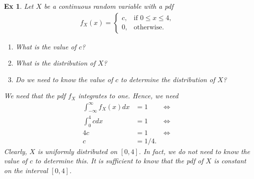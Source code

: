 \documentclass[a4paper,11pt]{article}
\newtheorem{exercise}[theorem]{Ex}
\begin{document}
\begin{exercise}
Let $X$ be a continuous random variable with a pdf
\begin{align}
    f_X(x) = \begin{cases}
    c, &\text{if } 0 \leq x \leq 4, \\
    0, &\text{otherwise}.
    \end{cases}
\end{align}
\begin{enumerate}
    \item What is the value of $c$?
    \item What is the distribution of $X$?
    \item Do we need to know the value of $c$ to determine the distribution of $X$?
\end{enumerate}

\begin{solution}
We need that the pdf $f_X$ integrates to one. Hence, we need
\begin{align}
    \int_{-\infty}^\infty f_X(x) dx &= 1 \qquad \iff \\
    \int_{0}^4 c dx &= 1 \qquad \iff \\
    4c &= 1 \qquad \iff \\
    c &= 1/4.
\end{align}
Clearly, $X$ is uniformly distributed on $[0,4]$. In fact, we do not need to know the value of $c$ to determine this. It is sufficient to know that the pdf of $X$ is constant on the interval $[0,4]$.
\end{solution}
\end{exercise}
\end{document}
